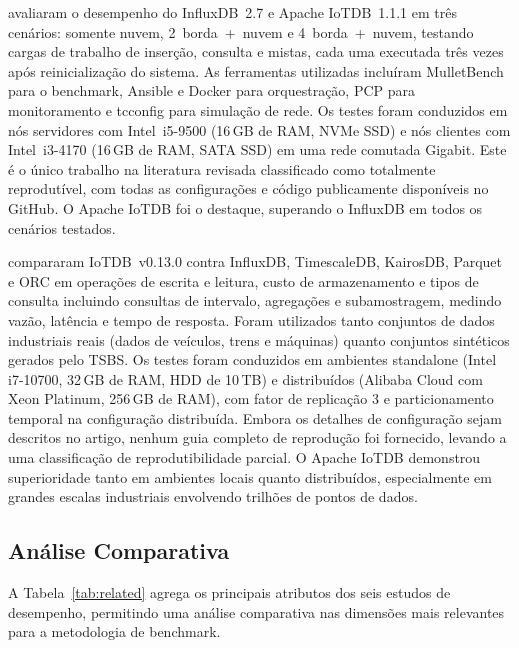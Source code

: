 \cite{pereira2023mulletbench} avaliaram o desempenho do InfluxDB~2.7 e Apache IoTDB~1.1.1 em
três cenários: somente nuvem, 2~borda~+~nuvem e 4~borda~+~nuvem, testando cargas de trabalho
de inserção, consulta e mistas, cada uma executada três vezes após reinicialização do sistema.
As ferramentas utilizadas incluíram MulletBench para o benchmark, Ansible e Docker para
orquestração, PCP para monitoramento e tcconfig para simulação de rede. Os testes foram
conduzidos em nós servidores com Intel~i5-9500 (16\,GB de RAM, NVMe SSD) e nós clientes com
Intel~i3-4170 (16\,GB de RAM, SATA SSD) em uma rede comutada Gigabit. Este é o único trabalho
na literatura revisada classificado como totalmente reprodutível, com todas as configurações e
código publicamente disponíveis no GitHub. O Apache IoTDB foi o destaque, superando o InfluxDB
em todos os cenários testados.

\cite{wang2023iotdb} compararam IoTDB~v0.13.0 contra InfluxDB, TimescaleDB, KairosDB, Parquet
e ORC em operações de escrita e leitura, custo de armazenamento e tipos de consulta incluindo
consultas de intervalo, agregações e subamostragem, medindo vazão, latência e tempo de
resposta. Foram utilizados tanto conjuntos de dados industriais reais (dados de veículos, trens
e máquinas) quanto conjuntos sintéticos gerados pelo TSBS. Os testes foram conduzidos em
ambientes standalone (Intel i7-10700, 32\,GB de RAM, HDD de 10\,TB) e distribuídos (Alibaba
Cloud com Xeon Platinum, 256\,GB de RAM), com fator de replicação 3 e particionamento temporal
na configuração distribuída. Embora os detalhes de configuração sejam descritos no artigo,
nenhum guia completo de reprodução foi fornecido, levando a uma classificação de
reprodutibilidade parcial. O Apache IoTDB demonstrou superioridade tanto em ambientes locais
quanto distribuídos, especialmente em grandes escalas industriais envolvendo trilhões de pontos
de dados.

\subsection{Análise Comparativa}

A Tabela~\ref{tab:related} agrega os principais atributos dos seis estudos de desempenho,
permitindo uma análise comparativa nas dimensões mais relevantes para a metodologia de
benchmark.

